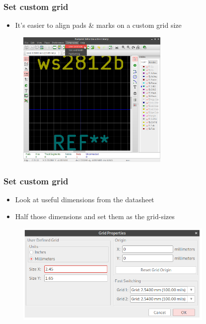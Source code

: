 \documentclass{beamer}
\begin{document}
\begin{frame}
  \frametitle{Set custom grid}
  \begin{itemize}
    \item It's easier to align pads \& marks on a custom grid size
  \end{itemize}
  \begin{figure}[H]
    \centering
    \includegraphics[width=0.65\textwidth]{images/step_03.png}
  \end{figure}
\end{frame}


\begin{frame}
  \frametitle{Set custom grid}
  \begin{itemize}
    \item Look at useful dimensions from the datasheet
    \item Half those dimensions and set them as the grid-sizes
  \end{itemize}
  \begin{figure}[H]
    \centering
    \includegraphics[width=0.85\textwidth]{images/step_04.png}
  \end{figure}
\end{frame}
\end{document}
